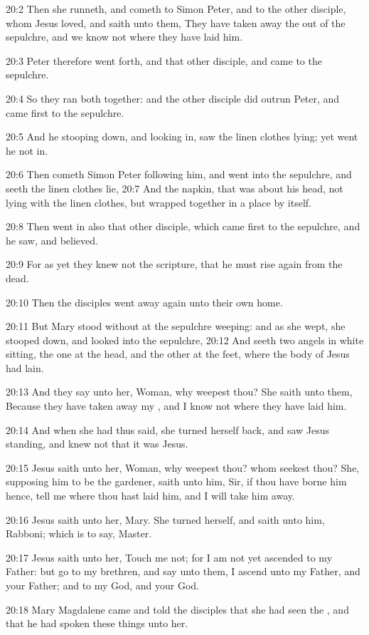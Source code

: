 20:2 Then she runneth, and cometh to Simon Peter, and to the other disciple, whom Jesus loved, and saith unto them, They have taken away the \LORD out of the sepulchre, and we know not where they have laid him.

20:3 Peter therefore went forth, and that other disciple, and came to the sepulchre.

20:4 So they ran both together: and the other disciple did outrun Peter, and came first to the sepulchre.

20:5 And he stooping down, and looking in, saw the linen clothes lying; yet went he not in.

20:6 Then cometh Simon Peter following him, and went into the sepulchre, and seeth the linen clothes lie, 20:7 And the napkin, that was about his head, not lying with the linen clothes, but wrapped together in a place by itself.

20:8 Then went in also that other disciple, which came first to the sepulchre, and he saw, and believed.

20:9 For as yet they knew not the scripture, that he must rise again from the dead.

20:10 Then the disciples went away again unto their own home.

20:11 But Mary stood without at the sepulchre weeping: and as she wept, she stooped down, and looked into the sepulchre, 20:12 And seeth two angels in white sitting, the one at the head, and the other at the feet, where the body of Jesus had lain.

20:13 And they say unto her, Woman, why weepest thou? She saith unto them, Because they have taken away my \LORD, and I know not where they have laid him.

20:14 And when she had thus said, she turned herself back, and saw Jesus standing, and knew not that it was Jesus.

20:15 Jesus saith unto her, Woman, why weepest thou? whom seekest thou?  She, supposing him to be the gardener, saith unto him, Sir, if thou have borne him hence, tell me where thou hast laid him, and I will take him away.

20:16 Jesus saith unto her, Mary. She turned herself, and saith unto him, Rabboni; which is to say, Master.

20:17 Jesus saith unto her, Touch me not; for I am not yet ascended to my Father: but go to my brethren, and say unto them, I ascend unto my Father, and your Father; and to my God, and your God.

20:18 Mary Magdalene came and told the disciples that she had seen the \LORD, and that he had spoken these things unto her.

